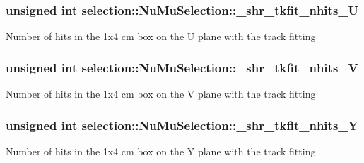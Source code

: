 \subsubsection[{\texorpdfstring{\+\_\+shr\+\_\+tkfit\+\_\+nhits\+\_\+U}{_shr_tkfit_nhits_U}}]{\setlength{\rightskip}{0pt plus 5cm}unsigned int selection\+::\+Nu\+Mu\+Selection\+::\+\_\+shr\+\_\+tkfit\+\_\+nhits\+\_\+U\hspace{0.3cm}{\ttfamily [private]}}\hypertarget{classselection_1_1NuMuSelection_a49ecf4415ef54632faa2317814210b36}{}\label{classselection_1_1NuMuSelection_a49ecf4415ef54632faa2317814210b36}
Number of hits in the 1x4 cm box on the U plane with the track fitting 
\subsubsection[{\texorpdfstring{\+\_\+shr\+\_\+tkfit\+\_\+nhits\+\_\+V}{_shr_tkfit_nhits_V}}]{\setlength{\rightskip}{0pt plus 5cm}unsigned int selection\+::\+Nu\+Mu\+Selection\+::\+\_\+shr\+\_\+tkfit\+\_\+nhits\+\_\+V\hspace{0.3cm}{\ttfamily [private]}}\hypertarget{classselection_1_1NuMuSelection_a089d245ba837cfc077d5f30dd1a309b5}{}\label{classselection_1_1NuMuSelection_a089d245ba837cfc077d5f30dd1a309b5}
Number of hits in the 1x4 cm box on the V plane with the track fitting 
\subsubsection[{\texorpdfstring{\+\_\+shr\+\_\+tkfit\+\_\+nhits\+\_\+Y}{_shr_tkfit_nhits_Y}}]{\setlength{\rightskip}{0pt plus 5cm}unsigned int selection\+::\+Nu\+Mu\+Selection\+::\+\_\+shr\+\_\+tkfit\+\_\+nhits\+\_\+Y\hspace{0.3cm}{\ttfamily [private]}}\hypertarget{classselection_1_1NuMuSelection_a8104bfe11a01a3afc80e48eebf0b4f1f}{}\label{classselection_1_1NuMuSelection_a8104bfe11a01a3afc80e48eebf0b4f1f}
Number of hits in the 1x4 cm box on the Y plane with the track fitting 
